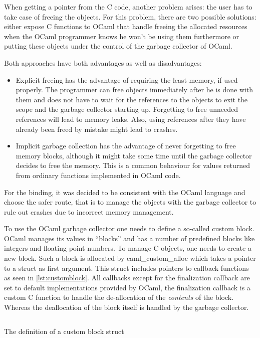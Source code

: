 \documentclass[parskip=half]{scrreprt}
\newcommand\inline[1]{{\addfontfeature{Letters=SmallCaps}#1}}
\begin{document}
When getting a pointer from the C code, another problem arises: the user has to
take case of freeing the objects. For this problem, there are two possible
solutions: either expose C functions to OCaml that handle freeing the allocated
resources when the OCaml programmer knows he won't be using them furthermore or
putting these objects under the control of the garbage collector of OCaml.

Both approaches have both advantages as well as disadvantages:

\begin{itemize}
  \item Explicit freeing has the advantage of requiring the least memory, if
    used properly. The programmer can free objects immediately after he is done
    with them and does not have to wait for the references to the objects to
    exit the scope and the garbage collector starting up. Forgetting to free
    unneeded references will lead to memory leaks. Also, using references after
    they have already been freed by mistake might lead to crashes.
  \item Implicit garbage collection has the advantage of never forgetting to
    free memory blocks, although it might take some time until the garbage
    collector decides to free the memory. This is a common behaviour for
    values returned from ordinary functions implemented in OCaml code.
\end{itemize}

For the binding, it was decided to be consistent with the OCaml language and
choose the safer route, that is to manage the objects with the garbage
collector to rule out crashes due to incorrect memory management.

To use the OCaml garbage collector one needs to define a so-called custom
block. OCaml manages its values in \enquote{blocks} and has a number of
predefined blocks like integers and floating point numbers. To manage C
objects, one needs to create a new block. Such a block is allocated by
\inline{caml\_custom\_alloc} which takes a pointer to a struct as first
argument. This struct includes pointers to callback functions as seen in
\autoref{lst:customblock}. All callbacks except for the finalization callback
are set to default implementations provided by OCaml, the finalization callback
is a custom C function to handle the de-allocation of the \emph{contents} of
the block. Whereas the deallocation of the block itself is handled by the
garbage collector.

\begin{listing}[h]
  \inputminted[linenos]{c}{custom-block.c}
  \caption{The definition of a custom block struct}
  \label{lst:customblock}
\end{listing}
\end{document}
